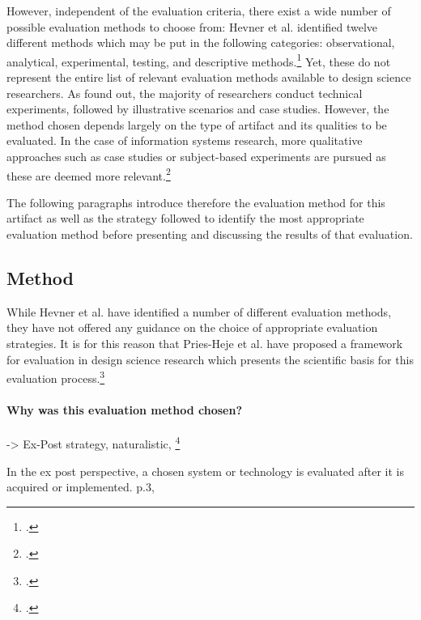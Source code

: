 However, independent of the evaluation criteria, there exist a wide number of possible evaluation methods to choose from: Hevner et al. identified twelve different methods which may be put in the following categories: observational, analytical, experimental, testing, and descriptive methods.\footcites[Cf.][p.86]{HevnerDesignScienceResearch2004} Yet, these do not represent the entire list of relevant evaluation methods available to design science researchers. As \cite{PfeffersDesignScienceResearch2012} found out, the majority of researchers conduct technical experiments,  followed by illustrative scenarios and case studies. However, the method chosen depends largely on the type of artifact and its qualities to be evaluated. In the case of information systems research, more qualitative approaches such as case studies or subject-based experiments are pursued as these are deemed more relevant.\footcites[Cf.][p.4 et seq]{PfeffersDesignScienceResearch2012}

The following paragraphs introduce therefore the evaluation method for this artifact as well as the strategy followed to identify the most appropriate evaluation method before presenting and discussing the results of that evaluation. 

\subsection{Method} \label{subsec:EvaluationMethod}

While Hevner et al. have identified a number of different evaluation methods, they have not offered any guidance on the choice of appropriate evaluation strategies. It is for this reason that Pries-Heje et al. have proposed a framework for evaluation in design science research which presents the scientific basis for this evaluation process.\footcites[Cf.][p.11 et seq]{Pries-HejeComprehensiveFrameworkEvaluation2012}


\paragraph{Why was this evaluation method chosen?} -> Ex-Post strategy, naturalistic, 
\footcite{PfeffersDesignScienceResearch2012} \cite{Pries-HejeComprehensiveFrameworkEvaluation2012}

In the ex post perspective, a chosen system or technology is evaluated after it is acquired or implemented. p.3, 
\cite{Pries-HejeStrategiesDesignScience}

